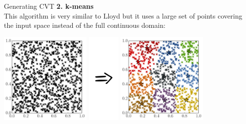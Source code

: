 \documentclass{beamer}
\begin{document}
\begin{frame}{Generating CVT }
\textbf{2. k-means}\\
This algorithm is very similar to Lloyd but it uses a large set of points covering the input space instead of the full continuous domain:
\begin{center}
\includegraphics[height=4.5cm]{figures/python/spf_kmeans1}
\includegraphics[height=4.5cm]{figures/Rightarrow}
\includegraphics[height=4.5cm]{figures/python/spf_kmeans2}
\end{center}
\end{frame}
\end{document}
